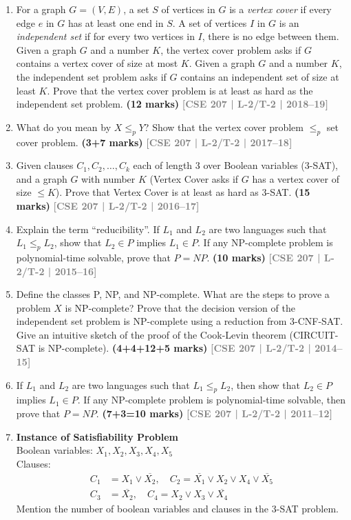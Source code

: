 \documentclass[12pt,a3paper]{article}
\newcommand{\yr}[1]{\hfill\textcolor{gray}{\small\textbf{[#1]}}}
\newcommand{\mk}[1]{\textcolor{orange!70!black}{\small\textbf{(#1 marks)}}}
\begin{document}
\begin{enumerate}
\item For a graph $G = (V, E)$, a set $S$ of vertices in $G$ is a \textit{vertex cover} if every edge $e$ in $G$ has at least one end in $S$. A set of vertices $I$ in $G$ is an \textit{independent set} if for every two vertices in $I$, there is no edge between them. Given a graph $G$ and a number $K$, the vertex cover problem asks if $G$ contains a vertex cover of size at most $K$. Given a graph $G$ and a number $K$, the independent set problem asks if $G$ contains an independent set of size at least $K$. Prove that the vertex cover problem is at least as hard as the independent set problem.
\mk{12} \yr{CSE 207 | L-2/T-2 | 2018--19}

\item What do you mean by $X \leq_p Y$? Show that the vertex cover problem $\leq_p$ set cover problem. \mk{3+7}
\yr{CSE 207 | L-2/T-2 | 2017--18}

\item Given clauses $C_1, C_2, \ldots, C_k$ each of length 3 over Boolean variables (3-SAT), and a graph $G$ with number $K$ (Vertex Cover asks if $G$ has a vertex cover of size $\leq K$). Prove that Vertex Cover is at least as hard as 3-SAT. \mk{15}
\yr{CSE 207 | L-2/T-2 | 2016--17}

\item Explain the term ``reducibility''. If $L_1$ and $L_2$ are two languages such that $L_1 \leq_p L_2$, show that $L_2 \in P$ implies $L_1 \in P$. If any NP-complete problem is polynomial-time solvable, prove that $P = NP$. \mk{10}
\yr{CSE 207 | L-2/T-2 | 2015--16}

\item Define the classes P, NP, and NP-complete. What are the steps to prove a problem $X$ is NP-complete? Prove that the decision version of the independent set problem is NP-complete using a reduction from 3-CNF-SAT. Give an intuitive sketch of the proof of the Cook-Levin theorem (CIRCUIT-SAT is NP-complete). \mk{4+4+12+5}
\yr{CSE 207 | L-2/T-2 | 2014--15}

\item If $L_1$ and $L_2$ are two languages such that $L_1 \leq_p L_2$, then show that $L_2 \in P$ implies $L_1 \in P$. If any NP-complete problem is polynomial-time solvable, then prove that $P = NP$. \mk{7+3=10}
\yr{CSE 207 | L-2/T-2 | 2011--12}


\item \textbf{Instance of Satisfiability Problem}\\
Boolean variables: $X_1, X_2, X_3, X_4, X_5$\\
Clauses:
\begin{align*}
C_1 &= X_1 \vee \overline{X_2}, \quad C_2 = \overline{X_1} \vee X_2 \vee X_4 \vee \overline{X_5}\\
C_3 &= \overline{X_2}, \quad C_4 = X_2 \vee X_3 \vee \overline{X_4}
\end{align*}
Mention the number of boolean variables and clauses in the 3-SAT problem.




\end{enumerate}
\end{document}
